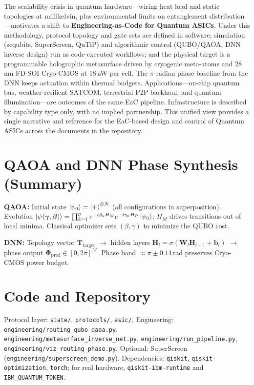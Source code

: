 \documentclass[11pt, a4paper]{article}
\begin{document}
The scalability crisis in quantum hardware---wiring heat load and static topologies at millikelvin, plus environmental limits on entanglement distribution---motivates a shift to \textbf{Engineering-as-Code for Quantum ASICs}. Under this methodology, protocol topology and gate sets are defined in software; simulation (scqubits, SuperScreen, QuTiP) and algorithmic control (QUBO/QAOA, DNN inverse design) run as code-executed workflows; and the physical target is a programmable holographic metasurface driven by cryogenic meta-atoms and 28\,nm FD-SOI Cryo-CMOS at 18\,nW per cell. The $\pi$-radian phase baseline from the DNN keeps actuation within thermal budgets. Applications---on-chip quantum bus, weather-resilient SATCOM, terrestrial P2P backhaul, and quantum illumination---are outcomes of the same EaC pipeline. Infrastructure is described by capability type only, with no implied partnership. This unified view provides a single narrative and reference for the EaC-based design and control of Quantum ASICs across the documents in the repository.

\appendix
\section{QAOA and DNN Phase Synthesis (Summary)}

\textbf{QAOA:} Initial state $\ket{\psi_0} = \ket{+}^{\otimes N}$ (all configurations in superposition). Evolution $\ket{\psi(\boldsymbol{\gamma},\boldsymbol{\beta})} = \prod_{k=1}^p e^{-i\beta_k H_M} e^{-i\gamma_k H_P} \ket{\psi_0}$; $H_M$ drives transitions out of local minima. Classical optimizer sets $(\beta,\gamma)$ to minimize the QUBO cost.

\textbf{DNN:} Topology vector $\mathbf{T}_{\mathrm{target}}$ $\to$ hidden layers $\mathbf{H}_l = \sigma(\mathbf{W}_l \mathbf{H}_{l-1} + \mathbf{b}_l)$ $\to$ phase output $\boldsymbol{\Phi}_{\mathrm{pred}} \in [0,2\pi]^M$. Phase band $\approx \pi \pm 0.14$\,rad preserves Cryo-CMOS power budget.

\section{Code and Repository}

Protocol layer: \texttt{state/}, \texttt{protocols/}, \texttt{asic/}. Engineering: \texttt{engineering/routing\_qubo\_qaoa.py}, \texttt{engineering/metasurface\_inverse\_net.py}, \texttt{engineering/run\_pipeline.py}, \texttt{engineering/viz\_routing\_phase.py}. Optional: SuperScreen (\texttt{engineering/superscreen\_demo.py}). Dependencies: \texttt{qiskit}, \texttt{qiskit-optimization}, \texttt{torch}; for real hardware, \texttt{qiskit-ibm-runtime} and \texttt{IBM\_QUANTUM\_TOKEN}.
\end{document}

